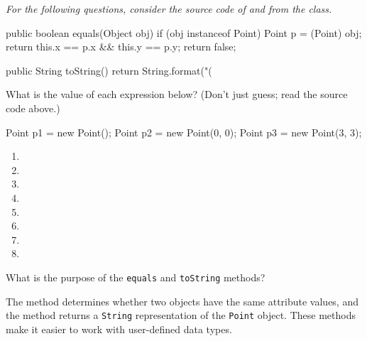 \vspace{2em}
\hrulefill

\vspace{1ex}
\textit{For the following questions, consider the source code of  and  from the  class.}
\vspace{1ex}

\begin{javalst}
public boolean equals(Object obj) {
    if (obj instanceof Point) {
        Point p = (Point) obj;
        return this.x == p.x && this.y == p.y;
    }
    return false;
}

public String toString() {
    return String.format("(%
}
\end{javalst}

\hrulefill
\vspace{1em}


\Q \label{expr}
What is the value of each expression below? (Don't just guess; read the source code above.)
\begin{javalst}
Point p1 = new Point();  Point p2 = new Point(0, 0);  Point p3 = new Point(3, 3);
\end{javalst}

\begin{multicols}{2}
\begin{enumerate}
\item {} 
\item {} 
\item {} 
\item {} 
\item {} 
\item {} 
\item {} 
\item {} 
\end{enumerate}
\end{multicols}


\Q What is the purpose of the \texttt{equals} and \texttt{toString} methods?

\begin{answer}[5em]
The  method determines whether two objects have the same attribute values, and the  method returns a \texttt{String} representation of the \texttt{Point} object.
These methods make it easier to work with user-defined data types.
\end{answer}


